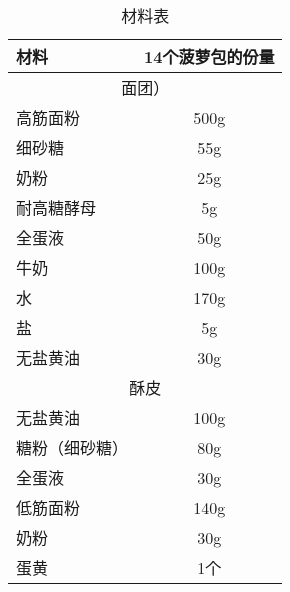 \begin{table}[h]
    \centering
    \begin{tabular}{|l||c|}\hline
     \textbf{材料}    &  \textbf{14个菠萝包的份量}\\ \hline\hline
    \multicolumn{2}{|c|}{面团）}\\ \hline
    高筋面粉 & 500g \\ \hline
    细砂糖 & 55g \\ \hline
    奶粉 & 25g \\ \hline
    耐高糖酵母 & 5g \\ \hline
    全蛋液 & 50g \\ \hline
    牛奶 & 100g \\ \hline
    水 & 170g \\ \hline
    盐 & 5g \\ \hline
    无盐黄油 & 30g \\ \hline
    \multicolumn{2}{|c|}{酥皮}\\ \hline
    无盐黄油   &  100g \\ \hline
    糖粉（细砂糖） & 80g \\ \hline
    全蛋液 & 30g \\ \hline
    低筋面粉 & 140g \\ \hline
    奶粉 & 30g \\ \hline
    蛋黄 & 1个 \\ \hline
    \end{tabular}
    \caption{材料表}
\end{table}

